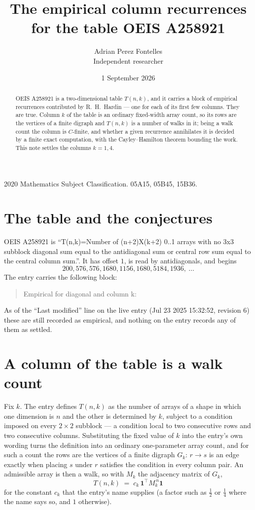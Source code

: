 \documentclass[11pt,a4paper]{article}
\title{The empirical column recurrences for the table OEIS A258921}
\author{Adrian Perez Fontelles\\ \small Independent researcher}
\date{1 September 2026}
\theoremstyle{plain}
\theoremstyle{definition}
\begin{document}
\maketitle

\begin{abstract}
OEIS A258921 is a two-dimensional table $T(n,k)$, and it carries a block of empirical
recurrences contributed by R.~H.~Hardin --- one for each of its first few columns. They are
true. Column $k$ of the table is an ordinary fixed-width array count, so its rows are the
vertices of a finite digraph and $T(n,k)$ is a number of walks in it; being a walk count the
column is $C$-finite, and whether a given recurrence annihilates it is decided by a finite
exact computation, with the Cayley--Hamilton theorem bounding the work. This note settles the columns $k=1, 4$.
\end{abstract}

\noindent\small 2020 Mathematics Subject Classification. 05A15, 05B45, 15B36.\normalsize

\section{The table and the conjectures}

OEIS A258921 is ``T(n,k)=Number of (n+2)X(k+2) 0..1 arrays with no 3x3 subblock diagonal sum equal to the antidiagonal sum or central row sum equal to the central column sum.''. It has offset $1$, is
read by antidiagonals, and begins
\[
200, 576, 576, 1680, 1156, 1680, 5184, 1936,\ \dots
\]
The entry carries the following block:
\begin{quote}\small
Empirical for diagonal and column k:\\
\end{quote}
As of the ``Last modified'' line on the live entry (Jul 23 2025 15:32:52, revision 6) these are still
recorded as empirical, and nothing on the entry records any of them as settled.

\section{A column of the table is a walk count}

Fix $k$. The entry defines $T(n,k)$ as the number of arrays of a shape in which one dimension
is $n$ and the other is determined by $k$, subject to a condition imposed on every
$2\times2$ subblock --- a condition local to two consecutive rows and two consecutive columns.
Substituting the fixed value of $k$ into the entry's own wording turns the definition into an
ordinary one-parameter array count, and for such a count the rows are the vertices of a finite
digraph $G_k$: $r\to s$ is an edge exactly when placing $s$ under $r$ satisfies the condition
in every column pair. An admissible array is then a walk, so with $M_k$ the adjacency matrix
of $G_k$,
\[
T(n,k)\;=\;c_k\,\mathbf{1}^{\!\top}M_k^{\,n}\mathbf{1}
\]
for the constant $c_k$ that the entry's name supplies (a factor such as $\tfrac12$ or
$\tfrac14$ where the name says so, and $1$ otherwise).
\end{document}
